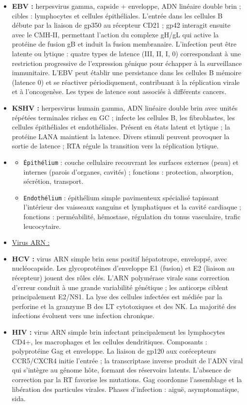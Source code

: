 \documentclass{article}
\begin{document}
\begin{itemize}
    \item \textbf{EBV :} herpesvirus gamma, capside + enveloppe, ADN linéaire double brin ; cibles : lymphocytes et cellules épithéliales. L'entrée dans les cellules B débute par la liaison de gp350 au récepteur CD21 ; gp42 interagit ensuite avec le CMH‑II, permettant l'action du complexe gH/gL qui active la protéine de fusion gB et induit la fusion membranaire. L'infection peut être latente ou lytique : quatre types de latence (III, II, I, 0) correspondant à une restriction progressive de l'expression génique pour échapper à la surveillance immunitaire. L'EBV peut établir une persistance dans les cellules B mémoire (latence 0) et se réactiver périodiquement, contribuant à la réplication virale et à l'oncogenèse. Les types de latence sont associés à différents cancers.
    \item \textbf{KSHV :} herpesvirus humain gamma, ADN linéaire double brin avec unités répétées terminales riches en GC ; infecte les cellules B, les fibroblastes, les cellules épithéliales et endothéliales. Présent en états latent et lytique ; la protéine LANA maintient la latence. Divers stimuli peuvent provoquer la sortie de latence ; RTA régule la transition vers la réplication lytique.
    \item \begin{itemize}
        \item \texttt{Épithélium} : couche cellulaire recouvrant les surfaces externes (peau) et internes (parois d'organes, cavités) ; fonctions : protection, absorption, sécrétion, transport.
        \item \texttt{Endothélium} : épithélium simple pavimenteux spécialisé tapissant l'intérieur des vaisseaux sanguins et lymphatiques et la cavité cardiaque ; fonctions : perméabilité, hémostase, régulation du tonus vasculaire, trafic leucocytaire.
    \end{itemize}
    \item \underline{Virus ARN :}
    \item \textbf{HCV :} virus ARN simple brin sens positif hépatotrope, enveloppé, avec nucléocapside. Les glycoprotéines d'enveloppe E1 (fusion) et E2 (liaison au récepteur) jouent des rôles clés. L'ARN polymérase virale sans correction d'erreur conduit à une grande variabilité génétique ; les anticorps ciblent principalement E2/NS1. La lyse des cellules infectées est médiée par la perforine et la granzyme B des LT cytotoxiques et des NK. La majorité des infections évoluent vers une infection chronique.
    \item \textbf{HIV :} virus ARN simple brin infectant principalement les lymphocytes CD4+, les macrophages et les cellules dendritiques. Composants : polyprotéine Gag et enveloppe. La liaison de gp120 aux corécepteurs CCR5/CXCR4 initie l'entrée ; la transcriptase inverse produit de l'ADN viral qui s'intègre au génome hôte, formant des réservoirs latents. L'absence de correction par la RT favorise les mutations. Gag coordonne l'assemblage et la libération des particules virales. Phases d'infection : aiguë, asymptomatique, sida.

\end{itemize}
\end{document}
